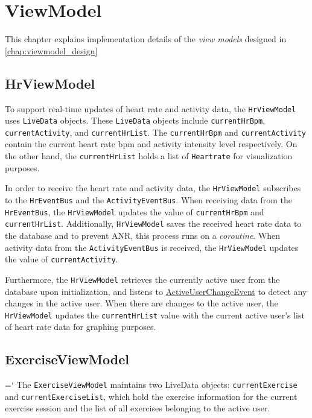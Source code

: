 \section{ViewModel}
This chapter explains implementation details of the \emph{view models} designed in \autoref{chap:viewmodel_design}

\subsection{HrViewModel}
\label{chap:hrviewmodel_impl}
To support real-time updates of heart rate and activity data, the \verb;HrViewModel; uses \verb;LiveData; objects. These \verb;LiveData; objects include \verb;currentHrBpm;, \verb;currentActivity;, and \verb;currentHrList;.
The \verb;currentHrBpm; and \verb;currentActivity; contain the current heart rate bpm and activity intensity level respectively. On the other hand, the \verb;currentHrList; holds a list of \verb;Heartrate; for visualization purposes.

In order to receive the heart rate and activity data, the \verb;HrViewModel; subscribes to the \verb;HrEventBus; and the \verb;ActivityEventBus;. 
When receiving data from the \verb;HrEventBus;, the \verb;HrViewModel; updates the value of \verb;currentHrBpm; and \verb;currentHrList;. 
Additionally, \verb;HrViewModel; saves the received heart rate data to the database and to prevent ANR, this process runs on a \emph{coroutine}.
When activity data from the \verb;ActivityEventBus; is received, the \verb;HrViewModel; updates the value of \verb;currentActivity;.

Furthermore, the \verb;HrViewModel; retrieves the currently active user from the database upon initialization, and listens to \url{ActiveUserChangeEvent} to detect any changes in the active user.
When there are changes to the active user, the \verb;HrViewModel; updates the \verb;currentHrList; value with the current active user's list of heart rate data for graphing purposes.

\subsection{ExerciseViewModel}
\label{chap:exerciseviewmodel_impl}
{{\ttfamily \hyphenchar\the\font=`\-}
The \verb;ExerciseViewModel; maintains two LiveData objects: \texttt{currentExercise} and \texttt{currentExerciseList}, which hold the exercise information for the current exercise session and the list of all exercises belonging to the active user. 
\par}

